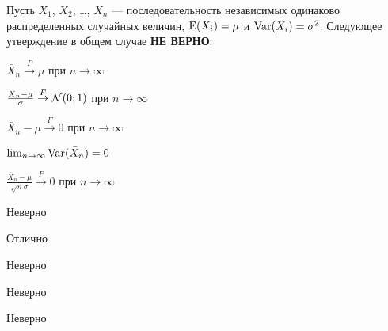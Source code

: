 
\begin{question}
Пусть \(X_1\), \(X_2\), \ldots, \(X_n\) — последовательность
независимых одинаково распределенных случайных величин, \(\operatorname{E}(X_i)=\mu\)
и \(\operatorname{Var}(X_i)=\sigma^2\). Следующее утверждение в общем случае
\textbf{НЕ ВЕРНО}:
\begin{answerlist}
  \item \(\bar{X}_n \overset{P}{\to} \mu\) при \(n\to\infty\)
  \item \(\frac{X_n-\mu}{\sigma} \overset{F}{\to} \mathcal{N}(0;1)\) при \(n\to\infty\)
  \item \(\bar{X}_n-\mu \overset{F}{\to } 0\) при \(n\to\infty\)
  \item \(\lim_{n\to\infty} \operatorname{Var}(\bar{X}_n)=0\)
  \item \(\frac{\bar{X}_n-\mu}{\sqrt{n} \sigma } \overset{P}{\to } 0\) при
\(n\to\infty\)
\end{answerlist}
\end{question}

\begin{solution}
\begin{answerlist}
  \item Неверно
  \item Отлично
  \item Неверно
  \item Неверно
  \item Неверно
\end{answerlist}
\end{solution}

